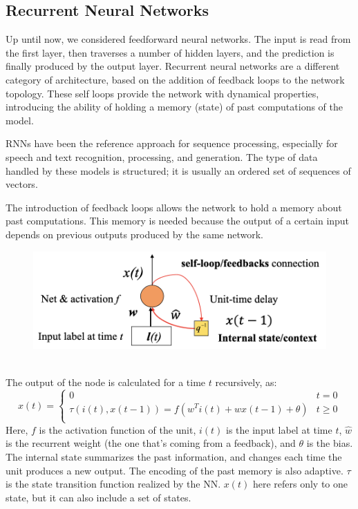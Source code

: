 \subsection{Recurrent Neural Networks}

Up until now, we considered feedforward neural networks. The input is read from the first layer, then traverses a number of hidden layers, and the prediction is finally produced by the output layer. Recurrent neural networks are a different category of architecture, based on the addition of feedback loops to the network topology. These self loops provide the network with dynamical properties, introducing the ability of holding a memory (state) of past computations of the model.

RNNs have been the reference approach for sequence processing, especially for speech and text recognition, processing, and generation. The type of data handled by these models is structured; it is usually an ordered set of sequences of vectors.

The introduction of feedback loops allows the network to hold a memory about past computations. This memory is needed because the output of a certain input depends on previous outputs produced by the same network.
\begin{figure}[ht]
    \centering
    \includegraphics[width=0.5\linewidth]{img/RNN_unit.png}
\end{figure} \\
The output of the node is calculated for a time $t$ recursively, as:
\begin{equation*}
    x(t) = \begin{cases}
            0 & t = 0 \\
            \tau(i(t), x(t-1)) = f(w^Ti(t) + \hat{w}x(t-1) + \theta) & t \geq 0 \\
    \end{cases}
\end{equation*}
Here, $f$ is the activation function of the unit, $i(t)$ is the input label at time $t$, $\hat{w}$ is the recurrent weight (the one that's coming from a feedback), and $\theta$ is the bias. The internal state summarizes the past information, and changes each time the unit produces a new output. The encoding of the past memory is also adaptive. $\tau$ is the state transition function realized by the NN. $x(t)$ here refers only to one state, but it can also include a set of states.

